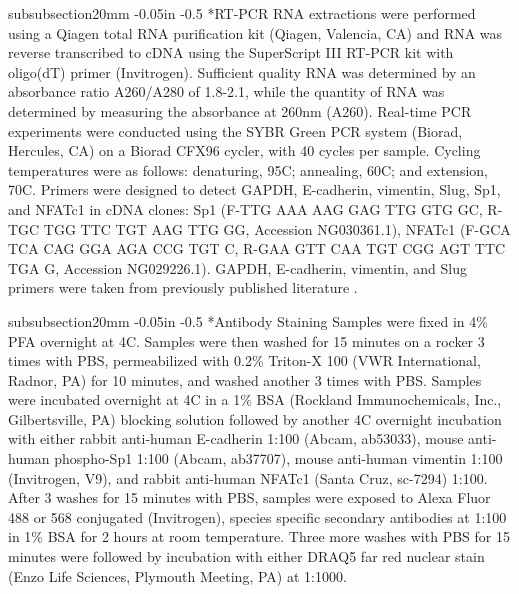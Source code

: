 \documentclass[12pt]{article}
\makeatletter
\renewcommand\subsubsection{\@startsection
	{subsubsection}{2}{0mm}
	{-0.05in}
	{-0.5\baselineskip}
	{\normalfont\normalsize\itshape}}
\makeatother
\begin{document}
\subsubsection*{RT-PCR}
RNA extractions were performed using a Qiagen total RNA purification kit (Qiagen, Valencia, CA) and RNA was reverse transcribed to cDNA using the SuperScript III RT-PCR kit with oligo(dT) primer (Invitrogen).  Sufficient quality RNA was determined by an absorbance ratio A260/A280 of 1.8-2.1, while the quantity of RNA was determined by measuring the absorbance at 260nm (A260).  Real-time PCR experiments were conducted using the SYBR Green PCR system (Biorad, Hercules, CA) on a Biorad CFX96 cycler, with 40 cycles per sample. Cycling temperatures were as follows: denaturing, 95C; annealing, 60C; and extension, 70C.  Primers were designed to detect GAPDH, E-cadherin, vimentin, Slug, Sp1, and NFATc1 in cDNA clones: Sp1 (F-TTG AAA AAG GAG TTG GTG GC, R-TGC TGG TTC TGT AAG TTG GG, Accession NG030361.1), NFATc1 (F-GCA TCA CAG GGA AGA CCG TGT C, R-GAA GTT CAA TGT CGG AGT TTC TGA G, Accession  NG029226.1).  GAPDH, E-cadherin, vimentin, and Slug primers were taken from previously published literature \citep{Medici:2008fk}.

\subsubsection*{Antibody Staining}
Samples were fixed in 4\% PFA overnight at 4C.   Samples were then washed for 15 minutes on a rocker 3 times with PBS, permeabilized with 0.2\% Triton-X 100 (VWR International, Radnor, PA) for 10 minutes, and washed another 3 times with PBS.  Samples were incubated overnight at 4C in a 1\% BSA (Rockland Immunochemicals, Inc., Gilbertsville, PA) blocking solution followed by another 4C overnight incubation with either rabbit anti-human E-cadherin 1:100 (Abcam, ab53033), mouse anti-human phospho-Sp1 1:100 (Abcam, ab37707), mouse anti-human vimentin 1:100  (Invitrogen, V9), and rabbit anti-human NFATc1 (Santa Cruz, sc-7294) 1:100.   After 3 washes for 15 minutes with PBS, samples were exposed to Alexa Fluor 488 or 568 conjugated (Invitrogen), species specific secondary antibodies at 1:100 in 1\% BSA for 2 hours at room temperature. Three more washes with PBS for 15 minutes were followed by incubation with either DRAQ5 far red nuclear stain (Enzo Life Sciences, Plymouth Meeting, PA) at 1:1000.
\end{document}
